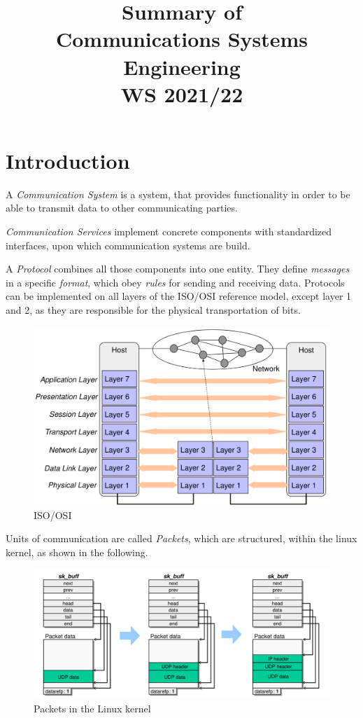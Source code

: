 \documentclass[english]{panikzettel}
\title{{\small Summary of} \\ Communications Systems Engineering \\ {\small WS 2021/22} \vspace{-1.5cm}}
\date{}
\begin{document}
	\maketitle
	\setcounter{tocdepth}{2}
	\tableofcontents

	\newpage
	\section{Introduction}
	\label{s-introduction}
	
	A \textit{Communication System} is a system, that provides functionality in order to be able to transmit data to other communicating parties.

	\textit{Communication Services} implement concrete components with standardized interfaces, upon which communication systems are build.

	A \textit{Protocol} combines all those components into one entity.
	They define \textit{messages} in a specific \textit{format}, which obey \textit{rules} for sending and receiving data.
	Protocols can be implemented on all layers of the ISO/OSI reference model, except layer 1 and 2, as they are responsible for the physical transportation of bits.

	\begin{figure}[H]
		\centering
		\includegraphics[width=\textwidth]{img/0-iso-osi.png}
		\caption{ISO/OSI}
		\label{img-0-iso-osi}
	\end{figure}
	
	Units of communication are called \textit{Packets}, which are structured, within the linux kernel, as shown in the following.

	\begin{figure}[H]
		\centering
		\includegraphics[width=\textwidth]{img/0-paket-kernel-rep.png}
		\caption{Packets in the Linux kernel}
		\label{img-0-paket-kernel-rep}
	\end{figure}
	
\end{document}
